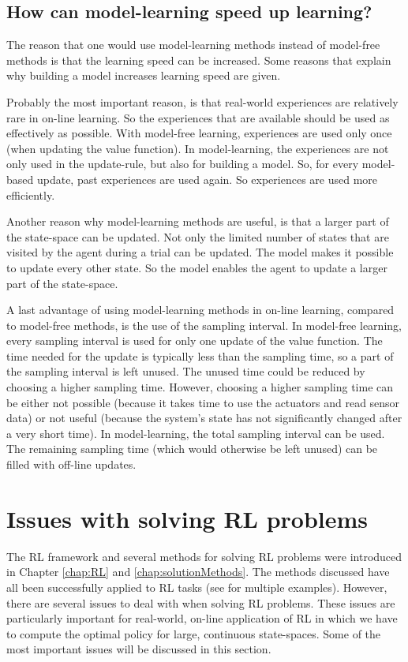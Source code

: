 \documentclass[a4paper,11pt]{mscLiterature}
\begin{document}
	\subsection{How can model-learning speed up learning?}
	The reason that one would use model-learning methods instead of model-free methods is that the learning speed can be increased. Some reasons that explain why building a model increases learning speed are given.
	
	Probably the most important reason, is that real-world experiences are relatively rare in on-line learning. So the experiences that are available should be used as effectively as possible. With model-free learning, experiences are used only once (when updating the value function). In model-learning, the experiences are not only used in the update-rule, but also for building a model. So, for every model-based update, past experiences are used again. So experiences are used more efficiently.
	
	Another reason why model-learning methods are useful, is that a larger part of the state-space can be updated. Not only the limited number of states that are visited by the agent during a trial can be updated. The model makes it possible to update every other state. So the model enables the agent to update a larger part of the state-space.
	
	A last advantage of using model-learning methods in on-line learning, compared to model-free methods, is the use of the sampling interval. In model-free learning, every sampling interval is used for only one update of the value function. The time needed for the update is typically less than the sampling time, so a part of the sampling interval is left unused. The unused time could be reduced by choosing a higher sampling time. However, choosing a higher sampling time can be either not possible (because it takes time to use the actuators and read sensor data) or not useful (because the system's state has not significantly changed after a very short time). In model-learning, the total sampling interval can be used. The remaining sampling time (which would otherwise be left unused) can be filled with off-line updates.
	

	
	
	\section{Issues with solving RL problems} \label{sec:issuesWithSolvingRLProblems}
	The RL framework and several methods for solving RL problems were introduced in Chapter \ref{chap:RL} and \ref{chap:solutionMethods}. The methods discussed have all been successfully applied to RL tasks (see \cite{SuttonBarto:98} for multiple examples). However, there are several issues to deal with when solving RL problems. These issues are particularly important for real-world, on-line application of RL in which we have to compute the optimal policy for large, continuous state-spaces. Some of the most important issues will be discussed in this section.
	
\end{document}
